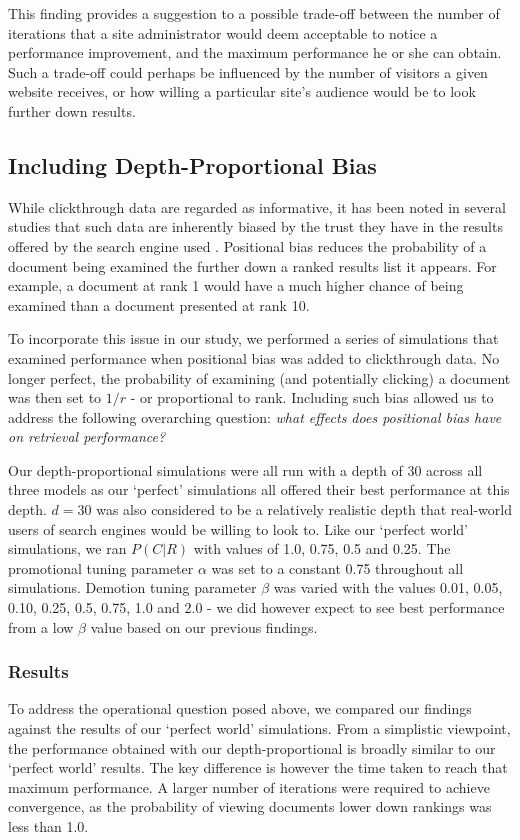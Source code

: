 This finding provides a suggestion to a possible trade-off between the number of iterations that a site administrator would deem acceptable to notice a performance improvement, and the maximum performance he or she can obtain. Such a trade-off could perhaps be influenced by the number of visitors a given website receives, or how willing a particular site's audience would be to look further down results.

\subsection{Including Depth-Proportional Bias}
While clickthrough data are regarded as informative, it has been noted in several studies that such data are inherently biased by the trust they have in the results offered by the search engine used \cite{granka2004eyetracking, joachims2005clickthrough}. Positional bias reduces the probability of a document being examined the further down a ranked results list it appears. For example, a document at rank 1 would have a much higher chance of being examined than a document presented at rank 10.

To incorporate this issue in our study, we performed a series of simulations that examined performance when positional bias was added to clickthrough data. No longer perfect, the probability of examining (and potentially clicking) a document was then set to $1/r$ - or proportional to rank. Including such bias allowed us to address the following overarching question: \emph{what effects does positional bias have on retrieval performance?}

Our depth-proportional simulations were all run with a depth of 30 across all three models as our `perfect' simulations all offered their best performance at this depth. $d=30$ was also considered to be a relatively realistic depth that real-world users of search engines would be willing to look to. Like our `perfect world' simulations, we ran $P(C|R)$ with values of 1.0, 0.75, 0.5 and 0.25. The promotional tuning parameter $\alpha$ was set to a constant 0.75 throughout all simulations. Demotion tuning parameter $\beta$ was varied with the values 0.01, 0.05, 0.10, 0.25, 0.5, 0.75, 1.0 and 2.0 - we did however expect to see best performance from a low $\beta$ value based on our previous findings.

\subsubsection{Results}
To address the operational question posed above, we compared our findings against the results of our `perfect world' simulations. From a simplistic viewpoint, the performance obtained with our depth-proportional is broadly similar to our `perfect world' results. The key difference is however the time taken to reach that maximum performance. A larger number of iterations were required to achieve convergence, as the probability of viewing documents lower down rankings was less than 1.0.

